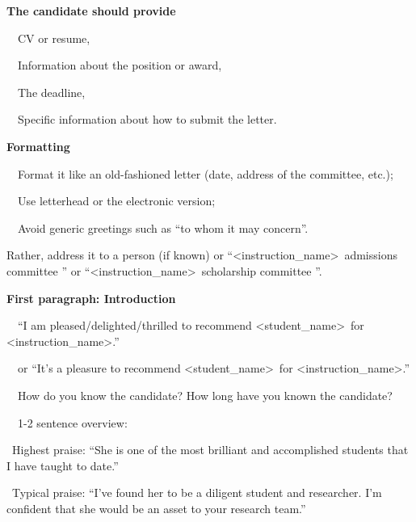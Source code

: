 \documentclass[a4paper, 12pt]{article}
\begin{document}
\textbf{The candidate should provide}
\par\ \textbullet\ CV or resume,
\par\ \textbullet\ Information about the position or award,
\par\ \textbullet\ The deadline,
\par\ \textbullet\ Specific information about how to submit the letter.

\textbf{Formatting}
\par\ \textbullet\ Format it like an old-fashioned letter (date, address of the committee, etc.);
\par\ \textbullet\ Use letterhead or the electronic version;
\par\ \textbullet\ Avoid generic greetings such as ``to whom it may concern''. 

\par Rather, address it to a person (if known) or ``\textless instruction\_name\textgreater\ admissions committee '' or ``\textless instruction\_name\textgreater\ scholarship committee ''.

\textbf{First paragraph: Introduction}
\par\ \textbullet\ ``I am pleased/delighted/thrilled to recommend \textless student\_name\textgreater\ for \textless instruction\_name\textgreater.''
\par\ \textbullet\ or ``It's a pleasure to recommend \textless student\_name\textgreater\ for \textless instruction\_name\textgreater.''
\par\ \textbullet\ How do you know the candidate? How long have you known the candidate?
\par\ \textbullet\ 1-2 sentence overview:
\par\quad\textopenbullet\ Highest praise: ``She is one of the most brilliant and accomplished students that I have taught to date.''
\par\quad\textopenbullet\ Typical praise: ``I've found her to be a diligent student and researcher. I'm confident that she would be an asset to your research team.''
\end{document}
